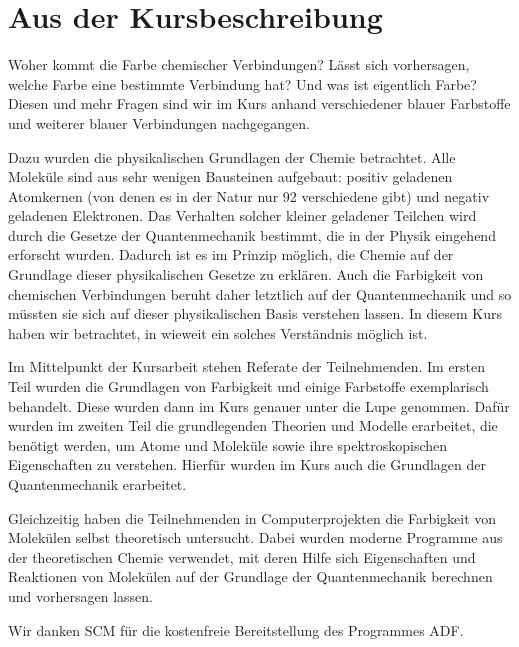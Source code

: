 \section{Aus der Kursbeschreibung}

Woher kommt die Farbe chemischer Verbindungen? Lässt sich vorhersagen,
welche Farbe eine bestimmte Verbindung hat? Und was ist eigentlich Farbe?
Diesen und mehr Fragen sind wir im Kurs anhand verschiedener blauer
Farbstoffe und weiterer blauer Verbindungen nachgegangen.

Dazu wurden die physikalischen Grundlagen der Chemie betrachtet.
Alle Moleküle sind aus sehr wenigen Bausteinen aufgebaut: positiv geladenen
Atomkernen (von denen es in der Natur nur 92 verschiedene gibt) und negativ
geladenen Elektronen. Das Verhalten solcher kleiner geladener Teilchen wird
durch die
Gesetze der Quantenmechanik bestimmt, die in der Physik eingehend erforscht
wurden. Dadurch ist es im Prinzip möglich, die Chemie auf der Grundlage dieser
physikalischen Gesetze zu erklären. Auch die Farbigkeit von chemischen
Verbindungen beruht daher
letztlich auf der Quantenmechanik und so müssten sie sich auf dieser
physikalischen Basis verstehen lassen. In diesem Kurs haben wir betrachtet,
in wieweit ein solches Verständnis möglich ist.

Im Mittelpunkt der Kursarbeit stehen Referate der Teilnehmenden. Im ersten Teil
wurden die Grundlagen von Farbigkeit und einige Farbstoffe exemplarisch
behandelt.
Diese wurden dann im Kurs genauer unter die Lupe genommen.
Dafür wurden im zweiten Teil die grundlegenden Theorien und Modelle erarbeitet,
die benötigt werden, um Atome und Moleküle sowie ihre spektroskopischen
Eigenschaften zu verstehen. Hierfür wurden im Kurs auch die Grundlagen der
Quantenmechanik erarbeitet.

Gleichzeitig haben die Teilnehmenden in Computerprojekten die Farbigkeit von
Molekülen selbst theoretisch untersucht. Dabei wurden moderne Programme aus
der theoretischen Chemie verwendet, mit deren Hilfe sich Eigenschaften und
Reaktionen von Molekülen auf der Grundlage der Quantenmechanik berechnen
und vorhersagen lassen.

Wir danken SCM für die kostenfreie Bereitstellung des Programmes ADF.
